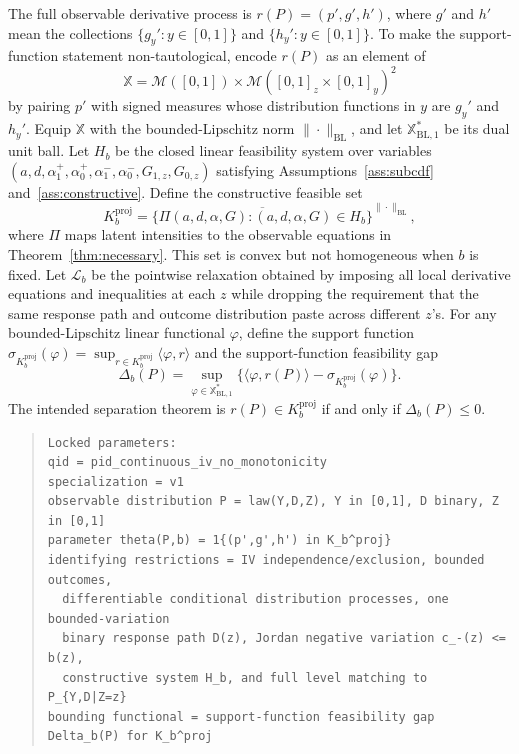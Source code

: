 \documentclass[11pt]{article}
\theoremstyle{definition}
\theoremstyle{plain}
\theoremstyle{remark}
\begin{document}
The full observable derivative process is \(r(P)=(p',g',h')\), where \(g'\) and \(h'\) mean the collections \(\{g_y':y\in[0,1]\}\) and \(\{h_y':y\in[0,1]\}\).  To make the support-function statement non-tautological, encode \(r(P)\) as an element of
\[
\mathbb X=\mathcal M([0,1])\times \mathcal M([0,1]_z\times[0,1]_y)^2
\]
by pairing \(p'\) with signed measures whose distribution functions in \(y\) are \(g_y'\) and \(h_y'\).  Equip \(\mathbb X\) with the bounded-Lipschitz norm \(\|\cdot\|_{\mathrm{BL}}\), and let \(\mathbb X^\ast_{\mathrm{BL},1}\) be its dual unit ball.  Let \(H_b\) be the closed linear feasibility system over variables \((a,d,\alpha^+_1,\alpha^+_0,\alpha^-_1,\alpha^-_0,G_{1,z},G_{0,z})\) satisfying Assumptions~\ref{ass:subcdf} and~\ref{ass:constructive}.  Define the constructive feasible set
\[
K_b^{\mathrm{proj}}=\overline{\{\Pi(a,d,\alpha,G):(a,d,\alpha,G)\in H_b\}}^{\|\cdot\|_{\mathrm{BL}}},
\]
where \(\Pi\) maps latent intensities to the observable equations in Theorem~\ref{thm:necessary}.  This set is convex but not homogeneous when \(b\) is fixed.  Let \(\mathcal L_b\) be the pointwise relaxation obtained by imposing all local derivative equations and inequalities at each \(z\) while dropping the requirement that the same response path and outcome distribution paste across different \(z\)'s.  For any bounded-Lipschitz linear functional \(\varphi\), define the support function \(\sigma_{K_b^{\mathrm{proj}}}(\varphi)=\sup_{r\in K_b^{\mathrm{proj}}}\langle\varphi,r\rangle\) and the support-function feasibility gap
\[
\Delta_b(P)=\sup_{\varphi\in\mathbb X^\ast_{\mathrm{BL},1}}\{\langle\varphi,r(P)\rangle-\sigma_{K_b^{\mathrm{proj}}}(\varphi)\}.
\]
The intended separation theorem is \(r(P)\in K_b^{\mathrm{proj}}\) if and only if \(\Delta_b(P)\le0\).

\begin{quote}
\begin{verbatim}
Locked parameters:
qid = pid_continuous_iv_no_monotonicity
specialization = v1
observable distribution P = law(Y,D,Z), Y in [0,1], D binary, Z in [0,1]
parameter theta(P,b) = 1{(p',g',h') in K_b^proj}
identifying restrictions = IV independence/exclusion, bounded outcomes,
  differentiable conditional distribution processes, one bounded-variation
  binary response path D(z), Jordan negative variation c_-(z) <= b(z),
  constructive system H_b, and full level matching to P_{Y,D|Z=z}
bounding functional = support-function feasibility gap Delta_b(P) for K_b^proj
\end{verbatim}
\end{quote}
\end{document}
